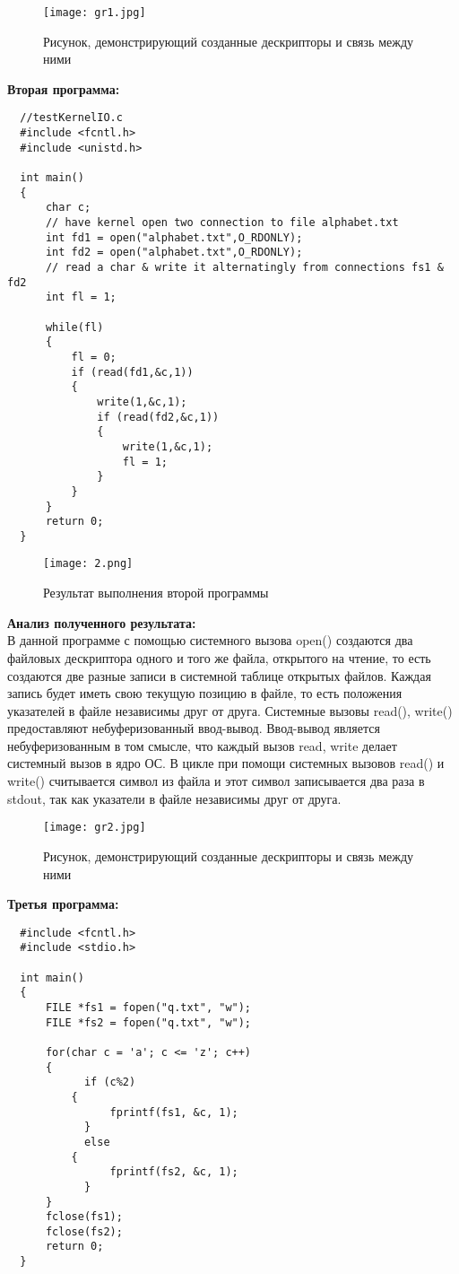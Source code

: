 \documentclass[a4paper,12pt]{article}
\begin{document}
\begin{figure}[th]
\texttt{[image: gr1.jpg]}
\caption{Рисунок, демонстрирующий созданные дескрипторы и связь между ними}
\label{ris:gr1}
\end{figure}

\textbf {Вторая программа:}
\begin{lstlisting}
  //testKernelIO.c
  #include <fcntl.h>
  #include <unistd.h>

  int main()
  {
      char c;    
      // have kernel open two connection to file alphabet.txt
      int fd1 = open("alphabet.txt",O_RDONLY);
      int fd2 = open("alphabet.txt",O_RDONLY);
      // read a char & write it alternatingly from connections fs1 & fd2
      int fl = 1;

      while(fl)
      {
          fl = 0;
          if (read(fd1,&c,1))
          {
              write(1,&c,1);
              if (read(fd2,&c,1))
              {
                  write(1,&c,1);
                  fl = 1;
              }
          }
      }
      return 0;
  }
\end{lstlisting}

\begin{figure}[th]
\texttt{[image: 2.png]}
\caption{Результат выполнения второй программы}
\label{ris:second}
\end{figure}
\textbf {Анализ полученного результата:}\\

В данной программе с помощью системного вызова open() создаются два файловых дескриптора одного и того же файла, открытого на чтение, то есть создаются две разные записи в системной таблице открытых файлов. Каждая запись будет иметь свою текущую позицию в файле, то есть положения указателей в файле независимы друг от друга. Системные вызовы read(), write() предоставляют небуферизованный ввод-вывод. Ввод-вывод является небуферизованным в том смысле, что каждый вызов read, write делает системный вызов в ядро ОС. В цикле при помощи системных вызовов read() и write() считывается символ из файла и этот символ записывается два раза в stdout, так как указатели в файле независимы друг от друга.
\\
\begin{figure}[th]
\texttt{[image: gr2.jpg]}
\caption{Рисунок, демонстрирующий созданные дескрипторы и связь между ними}
\label{ris:gr2}
\end{figure}

\newpage
\textbf {Третья программа:}
\begin{lstlisting}
  #include <fcntl.h>
  #include <stdio.h>

  int main() 
  {
      FILE *fs1 = fopen("q.txt", "w");
      FILE *fs2 = fopen("q.txt", "w");

      for(char c = 'a'; c <= 'z'; c++)
      {
	        if (c%2)
          {
	            fprintf(fs1, &c, 1);
	        }
    	    else
          {
	            fprintf(fs2, &c, 1);
	        }
      }
      fclose(fs1);
      fclose(fs2);
      return 0;
  }
\end{lstlisting}
 
\end{document}
